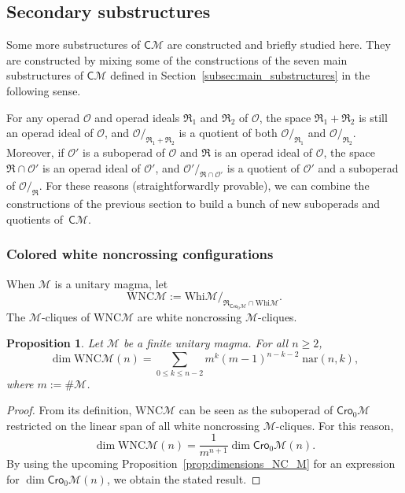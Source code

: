 \documentclass[10pt,reqno]{amsart}
\numberwithin{equation}{subsection}
\renewcommand{\leq}{\leqslant}
\renewcommand{\geq}{\geqslant}
\newtheorem{Proposition}[Theorem]{Proposition}
\newcommand{\Oca}{\mathcal{O}}
\newcommand{\Mca}{\mathcal{M}}
\newcommand{\Cli}{\mathsf{C}}
\newcommand{\Cro}{\mathsf{Cro}}
\newcommand{\Whi}{\mathrm{Whi}}
\newcommand{\WNC}{\mathrm{WNC}}
\newcommand{\Nar}{\mathrm{nar}}
\newcommand{\Rel}{\mathfrak{R}}
\begin{document}
\subsection{Secondary substructures}%
\label{subsec:secondary_substructures}
Some more substructures of $\Cli\Mca$ are constructed and briefly
studied here. They are constructed by mixing some of the constructions
of the seven main substructures of $\Cli\Mca$ defined in
Section~\ref{subsec:main_substructures} in the following sense.
\medskip

For any operad $\Oca$ and operad ideals $\Rel_1$ and $\Rel_2$ of $\Oca$,
the space $\Rel_1 + \Rel_2$ is still an operad ideal of $\Oca$, and
$\Oca/_{\Rel_1 + \Rel_2}$ is a quotient of both $\Oca/_{\Rel_1}$ and
$\Oca/_{\Rel_2}$. Moreover, if $\Oca'$ is a suboperad of $\Oca$ and
$\Rel$ is an operad ideal of $\Oca$, the space $\Rel \cap \Oca'$ is an
operad ideal of $\Oca'$, and $\Oca'/_{\Rel \cap \Oca'}$ is a quotient of
$\Oca'$ and a suboperad of $\Oca/_\Rel$. For these reasons
(straightforwardly provable), we can combine the constructions of the
previous section to build a bunch of new suboperads and quotients
of~$\Cli\Mca$.
\medskip

\subsubsection{Colored white noncrossing configurations}
When $\Mca$ is a unitary magma, let
\begin{equation}
    \WNC\Mca := \Whi\Mca/_{\Rel_{\Cro_0\Mca} \cap \Whi\Mca}.
\end{equation}
The $\Mca$-cliques of $\WNC\Mca$ are white noncrossing $\Mca$-cliques.
\medskip

\begin{Proposition} \label{prop:dimensions_WNC_M}
    Let $\Mca$ be a finite unitary magma. For all $n \geq 2$,
    \begin{equation}
        \dim \WNC\Mca(n) =
        \sum_{0 \leq k \leq n - 2}
        m^k (m - 1)^{n - k - 2} \; \Nar(n, k),
    \end{equation}
    where $m := \# \Mca$.
\end{Proposition}
\begin{proof}
    From its definition, $\WNC\Mca$ can be seen as the suboperad of
    $\Cro_0 \Mca$ restricted on the linear span of all white noncrossing
    $\Mca$-cliques. For this reason,
    \begin{equation}
        \dim \WNC\Mca(n) = \frac{1}{m^{n + 1}} \dim \Cro_0 \Mca(n).
    \end{equation}
    By using the upcoming Proposition~\ref{prop:dimensions_NC_M} for an
    expression for $\dim \Cro_0\Mca(n)$, we obtain the stated result.
\end{proof}
\medskip
\end{document}
